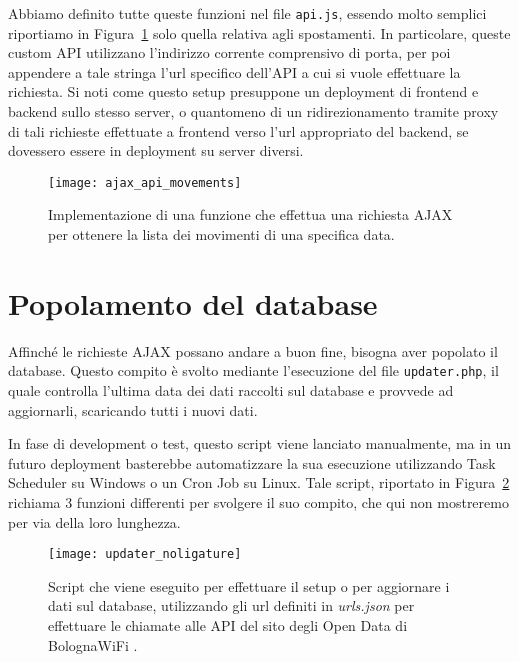 Abbiamo definito tutte queste funzioni nel file \Verb_api.js_, essendo molto semplici riportiamo in Figura~\ref{fig:ajax_api_movements} solo quella relativa agli spostamenti. In particolare, queste custom API utilizzano l'indirizzo corrente comprensivo di porta, per poi appendere a tale stringa l'url specifico dell'API a cui si vuole effettuare la richiesta. Si noti come questo setup presuppone un deployment di frontend e backend sullo stesso server, o quantomeno di un ridirezionamento tramite proxy di tali richieste effettuate a frontend verso l'url appropriato del backend, se dovessero essere in deployment su server diversi.

\begin{figure}[H]
    \centering
    \texttt{[image: ajax\_api\_movements]}
    \caption[Funzione AJAX per ottenere la lista dei movimenti di una specifica data]{Implementazione di una funzione che effettua una richiesta AJAX per ottenere la lista dei movimenti di una specifica data.}
    \label{fig:ajax_api_movements}
\end{figure}

\section{Popolamento del database}
Affinché le richieste AJAX possano andare a buon fine, bisogna aver popolato il database. Questo compito è svolto mediante l'esecuzione del file \Verb_updater.php_, il quale controlla l'ultima data dei dati raccolti sul database e provvede ad aggiornarli, scaricando tutti i nuovi dati.

In fase di development o test, questo script viene lanciato manualmente, ma in un futuro deployment basterebbe automatizzare la sua esecuzione utilizzando Task Scheduler su Windows o un Cron Job su Linux. Tale script, riportato in Figura~\ref{fig:updater} richiama 3 funzioni differenti per svolgere il suo compito, che qui non mostreremo per via della loro lunghezza.

\begin{figure}[H]
    \centering
    \texttt{[image: updater\_noligature]}
    \caption[]{Script che viene eseguito per effettuare il setup o per aggiornare i dati sul database, utilizzando gli url definiti in \textit{urls.json} per effettuare le chiamate alle API del sito degli Open Data di BolognaWiFi \cite{BolognaWiFi_Spostamenti,BolognaWiFi_Affollamento,BolognaWiFi_Affluenza}.}
    \label{fig:updater}
\end{figure}

